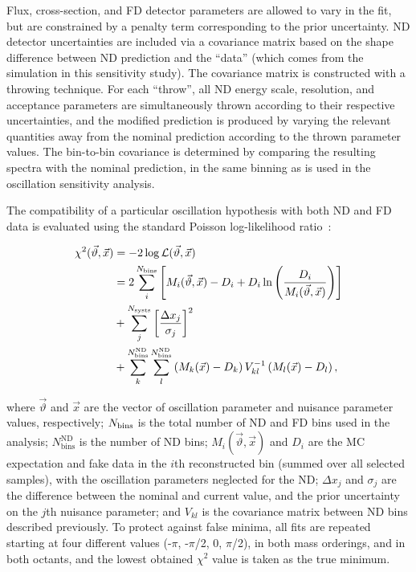 Flux, cross-section, and FD detector parameters are allowed to vary in the fit, but are constrained by a penalty term corresponding to the prior uncertainty. ND detector uncertainties are included via a covariance matrix based on the shape difference between ND prediction and the ``data'' (which comes from the simulation in this sensitivity study). The covariance matrix is constructed with a throwing technique. For each ``throw'', all ND energy scale, resolution, and acceptance parameters are simultaneously thrown according to their respective uncertainties, and the modified prediction is produced by varying the relevant quantities away from the nominal prediction according to the thrown parameter values. The bin-to-bin covariance is determined by comparing the resulting spectra with the nominal prediction, in the same binning as is used in the oscillation sensitivity analysis.

The compatibility of a particular oscillation hypothesis with both ND and FD data is evaluated using the standard Poisson log-likelihood ratio~\cite{Tanabashi:2018oca}:
\begin{linenomath*}
  \begin{equation}
    \begin{aligned}
      \chi^2(\vec{\vartheta}, \vec{x}) &= -2\log\mathcal{L}(\vec{\vartheta}, \vec{x}) \\
      &= 2\sum_i^{N_{\rm bins}}\left[ M_i(\vec{\vartheta}, \vec{x})-D_i+D_i\ln\left({D_i\over M_i(\vec{\vartheta}, \vec{x})}\right) \right] \\
      &+ \sum_{j}^{N_{\mathrm{systs}}}\left[ \frac{\Delta x_{j}}{\sigma_{j}} \right]^{2} \\
      &+ \sum^{N^{\mathrm{ND}}_{\mathrm{bins}}}_{k}\sum^{N^{\mathrm{ND}}_{\mathrm{bins}}}_{l} \left(M_k(\vec{x})-D_k \right) V^{-1}_{kl}\left(M_l(\vec{x})-D_l \right),
    \end{aligned}
    \label{eq:chisq}
  \end{equation}
\end{linenomath*}
where $\vec{\vartheta}$ and $\vec{x}$ are the vector of oscillation parameter and nuisance parameter values, respectively; $N_{\rm bins}$ is the total number of ND and FD bins used in the analysis; $N^{\mathrm{ND}}_{\mathrm{bins}}$ is the number of ND bins; $M_i(\vec{\vartheta}, \vec{x})$ and $D_{i}$ are the MC expectation and fake data in the $i$th reconstructed bin (summed over all selected samples), with the oscillation parameters neglected for the ND; $\Delta x_{j}$ and $\sigma_{j}$ are the difference between the nominal and current value, and the prior uncertainty on the $j$th nuisance parameter; and $V_{kl}$ is the covariance matrix between ND bins described previously. To protect against false minima, all fits are repeated starting at four different \deltacp values (-$\pi$, -$\pi$/2, 0, $\pi$/2), in both mass orderings, and in both  octants, and the lowest obtained $\chi^{2}$ value is taken as the true minimum.

